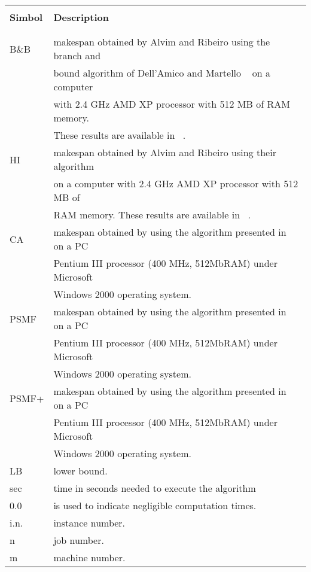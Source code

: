 \documentclass[12pt,a4paper]{article}
\begin{document}
\begin{tabular}{l l}\hline
        &  \\[-0.01in]
{\bf Simbol} &  {\bf Description} \\[-0.01in]
        &  \\[-0.01in]\hline
        &  \\[-0.01in]
B\&B      & makespan obtained by Alvim and  Ribeiro using the branch and\\[-0.01in]
        & bound algorithm of Dell'Amico and Martello ~\cite{Dell'Amico95} on a computer\\[-0.01in]
        & with 2.4 GHz
        AMD  XP processor with 512 MB of RAM memory. \\[-0.01in]
        &These results  are available in ~\cite{Alvim04b}.\\[-0.01in]
HI      & makespan obtained by Alvim and  Ribeiro using their algorithm ~\cite{Alvim04a}\\[-0.01in]
        &on a computer with 2.4 GHz
        AMD  XP processor with 512 MB of \\[-0.01in]
        &RAM memory. These results are available in ~\cite{Alvim04b}.\\[-0.01in]
CA      & makespan obtained by using the algorithm presented in ~\cite{Paletta07} on a PC \\[-0.01in]
        &Pentium III processor (400 MHz, 512MbRAM) under Microsoft\\[-0.01in]
        &Windows 2000 operating system.\\[-0.01in]
PSMF      & makespan obtained by using the algorithm presented in  ~\cite{Paletta14} on a PC \\[-0.01in]
        &Pentium III processor (400 MHz, 512MbRAM) under Microsoft\\[-0.01in]
        &Windows 2000 operating system.\\[-0.01in]
PSMF+     & makespan obtained by using the algorithm presented in ~\cite{Paletta14} on a PC \\[-0.01in]
        &Pentium III processor (400 MHz, 512MbRAM) under Microsoft\\[-0.01in]
        &Windows 2000 operating system.\\[-0.01in]
LB      & lower bound. \\[-0.01in]
sec     & time in seconds needed to execute the algorithm \\[-0.01in]
0.0     & is used to indicate negligible computation times. \\[-0.01in]
i.n.  & instance number. \\[-0.01in]
n       & job number.    \\[-0.01in]
m       & machine number. \\[-0.01in]
\end{tabular}
\end{document}
